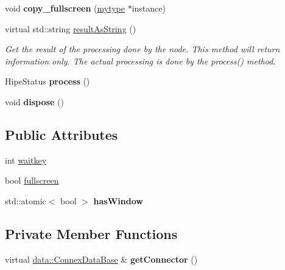\begin{DoxyCompactItemize}
void {\bfseries copy\+\_\+fullscreen} (\hyperlink{classfilter_1_1algos_1_1_show_video}{mytype} $\ast$instance)
\item 
virtual std\+::string \hyperlink{classfilter_1_1algos_1_1_show_video_a8fc9113fbd7f9648ea0997304ca91aec}{result\+As\+String} ()
\begin{DoxyCompactList}\small\item\em Get the result of the processing done by the node. This method will return information only. The actual processing is done by the process() method. \end{DoxyCompactList}\item 
\mbox{\label{classfilter_1_1algos_1_1_show_video_a5bfce42b64c8df7200981aad6ceb3bfa}} 
Hipe\+Status {\bfseries process} ()
\item 
\mbox{\label{classfilter_1_1algos_1_1_show_video_a1df6776e0c100848e59a2f00b7edcceb}} 
void {\bfseries dispose} ()
\end{DoxyCompactItemize}
\subsection*{Public Attributes}
\begin{DoxyCompactItemize}
\item 
int \hyperlink{classfilter_1_1algos_1_1_show_video_ae0d5a03d050969d16b132fb722510a53}{waitkey}
\item 
bool \hyperlink{classfilter_1_1algos_1_1_show_video_a68f4e6f1cd76528022ac6b6a5614c64c}{fullscreen}
\item 
\mbox{\label{classfilter_1_1algos_1_1_show_video_a95f1a0fc1f7434ba4afcc0a5ac21e79c}} 
std\+::atomic$<$ bool $>$ {\bfseries has\+Window}
\end{DoxyCompactItemize}
\subsection*{Private Member Functions}
\begin{DoxyCompactItemize}
\item 
\mbox{\label{classfilter_1_1algos_1_1_show_video_a29089fcae12e1dda1ec6a95b328e95f0}} 
virtual \hyperlink{classfilter_1_1data_1_1_connex_data_base}{data\+::\+Connex\+Data\+Base} \& {\bfseries get\+Connector} ()
\end{DoxyCompactItemize}
